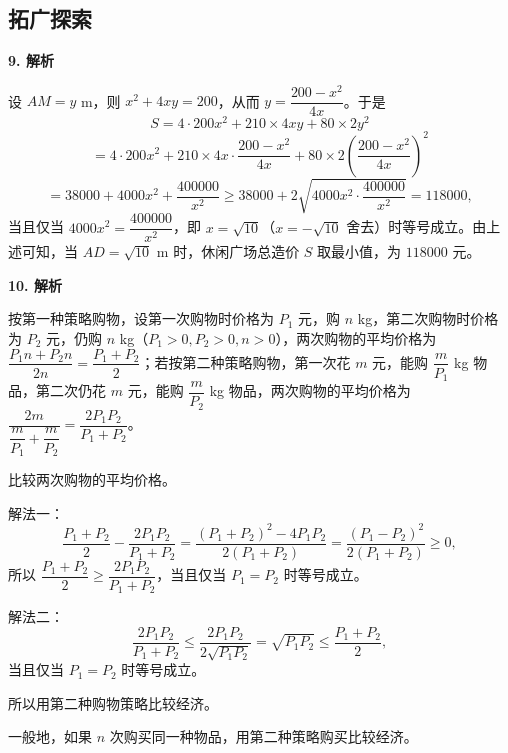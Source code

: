 \documentclass[11pt,a4paper]{article}
\begin{document}
	\subsection*{拓广探索}
	
	\noindent\textbf{9. 解析}
	
	设 $AM=y$ m，则 $x^2+4xy=200$，从而 $y=\dfrac{200-x^2}{4x}$。于是
	\[
	S=4\cdot 200x^2+210\times 4xy+80\times 2y^2
	\]
	\[
	=4\cdot 200x^2+210\times 4x\cdot \frac{200-x^2}{4x}+80\times 2\left(\frac{200-x^2}{4x}\right)^2
	\]
	\[
	=38000+4000x^2+\frac{400000}{x^2}\geq 38000+2\sqrt{4000x^2\cdot \frac{400000}{x^2}}=118000,
	\]
	当且仅当 $4000x^2=\dfrac{400000}{x^2}$，即 $x=\sqrt{10}$（$x=-\sqrt{10}$ 舍去）时等号成立。由上述可知，当 $AD=\sqrt{10}$ m 时，休闲广场总造价 $S$ 取最小值，为 $118000$ 元。
	
	\noindent\textbf{10. 解析}
	
	按第一种策略购物，设第一次购物时价格为 $P_1$ 元，购 $n$ kg，第二次购物时价格为 $P_2$ 元，仍购 $n$ kg（$P_1>0,P_2>0,n>0$），两次购物的平均价格为 $\dfrac{P_1n+P_2n}{2n}=\dfrac{P_1+P_2}{2}$；若按第二种策略购物，第一次花 $m$ 元，能购 $\dfrac{m}{P_1}$ kg 物品，第二次仍花 $m$ 元，能购 $\dfrac{m}{P_2}$ kg 物品，两次购物的平均价格为 $\dfrac{2m}{\dfrac{m}{P_1}+\dfrac{m}{P_2}}=\dfrac{2P_1P_2}{P_1+P_2}$。
	
	比较两次购物的平均价格。
	
	解法一：
	\[
	\frac{P_1+P_2}{2}-\frac{2P_1P_2}{P_1+P_2}
	=\frac{(P_1+P_2)^2-4P_1P_2}{2(P_1+P_2)}
	=\frac{(P_1-P_2)^2}{2(P_1+P_2)}\geq 0,
	\]
	所以 $\dfrac{P_1+P_2}{2}\geq \dfrac{2P_1P_2}{P_1+P_2}$，当且仅当 $P_1=P_2$ 时等号成立。
	
	解法二：
	\[
	\frac{2P_1P_2}{P_1+P_2}\leq \frac{2P_1P_2}{2\sqrt{P_1P_2}}=\sqrt{P_1P_2}\leq \frac{P_1+P_2}{2},
	\]
	当且仅当 $P_1=P_2$ 时等号成立。
	
	所以用第二种购物策略比较经济。
	
	一般地，如果 $n$ 次购买同一种物品，用第二种策略购买比较经济。
	
\end{document}

